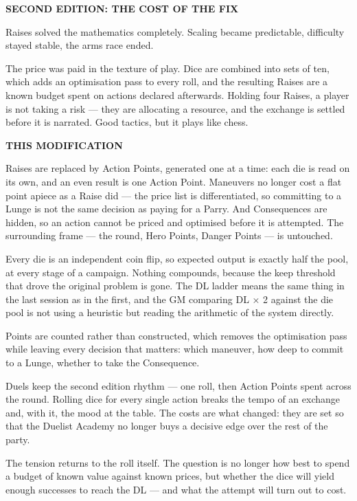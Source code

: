 \documentclass[10pt,twoside,openany]{book}
\begin{document}
	\vspace{1em}
	\textbf{SECOND EDITION: THE COST OF THE FIX}
	
	Raises solved the mathematics completely. Scaling became predictable, difficulty
	stayed stable, the arms race ended.
	
	The price was paid in the texture of play. Dice are combined into sets of ten, which
	adds an optimisation pass to every roll, and the resulting Raises are a known budget
	spent on actions declared afterwards. Holding four Raises, a player is not taking a
	risk — they are allocating a resource, and the exchange is settled before it is
	narrated. Good tactics, but it plays like chess.
	
	\newpage
	\textbf{THIS MODIFICATION}
	
	Raises are replaced by Action Points, generated one at a time: each die is read on its own, and an even result is one Action Point. Maneuvers no longer cost a flat point apiece as a Raise did — the price list is differentiated, so committing to a Lunge is not the same decision as paying for a Parry. And Consequences are hidden, so an action cannot be priced and optimised before it is attempted. The surrounding frame — the round, Hero Points, Danger Points — is untouched.
	
	Every die is an independent coin flip, so expected output is exactly half the pool, at every stage of a campaign. Nothing compounds, because the keep threshold that drove the original problem is gone. The DL ladder means the same thing in the last session as in the first, and the GM comparing DL × 2 against the die pool is not using a heuristic but reading the arithmetic of the system directly.
	
	Points are counted rather than constructed, which removes the optimisation pass while leaving every decision that matters: which maneuver, how deep to commit to a Lunge, whether to take the Consequence.
	
	Duels keep the second edition rhythm — one roll, then Action Points spent across the round. Rolling dice for every single action breaks the tempo of an exchange and, with it, the mood at the table. The costs are what changed: they are set so that the Duelist Academy no longer buys a decisive edge over the rest of the party.
	
	The tension returns to the roll itself. The question is no longer how best to spend a budget of known value against known prices, but whether the dice will yield enough successes to reach the DL — and what the attempt will turn out to cost.
	
\end{document}
